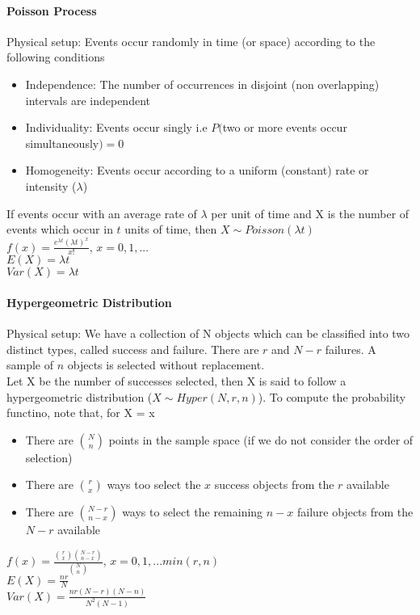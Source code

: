 \documentclass[12pt]{report}
\begin{document}
    \paragraph{Poisson Process}
      Physical setup: Events occur randomly in time (or space) according to the
      following conditions
      \begin{itemize}
        \item Independence: The number of occurrences in disjoint (non
          overlapping) intervals are independent
        \item Individuality: Events occur singly i.e $P($two or more events
          occur simultaneously$) = 0$
        \item Homogeneity: Events occur according to a uniform (constant) rate
          or intensity ($\lambda$)
      \end{itemize}
      If events occur with an average rate of $\lambda$ per unit of time
      and X is the number of events which occur in $t$ units of time, then $X
      \sim Poisson(\lambda t)$\\
      $f(x) = \frac{e^{\lambda t}(\lambda t)^x}{x!}$, $x = 0, 1, ...$\\
      $E(X) = \lambda t$\\
      $Var(X) = \lambda t$

    \paragraph{Hypergeometric Distribution}
      Physical setup: We have a collection of N objects which can be classified
      into two distinct types, called success and failure. There are $r$ and $N
      - r$ failures. A sample of $n$ objects is selected without replacement.\\
      Let X be the number of successes selected, then X is said to follow a
      hypergeometric distribution ($X \sim Hyper(N, r, n)$). To compute the
      probability functino, note that, for X = x
      \begin{itemize}
        \item There are $\binom{N}{n}$ points in the sample space (if we do not
          consider the order of selection)
        \item There are $\binom{r}{x}$ ways too select the $x$ success objects
          from the $r$ available
        \item There are $\binom{N-r}{n-x}$ ways to select the remaining $n-x$
          failure objects from the $N-r$ available
      \end{itemize}
      $f(x) = \frac{\binom{r}{x}\binom{N-r}{n-x}}{\binom{N}{n}}$, $x = 0, 1,
      ... min(r, n)$\\
      $E(X) = \frac{nr}{N}$\\
      $Var(X) = \frac{nr(N-r)(N-n)}{N^2(N-1)}$
\end{document}
